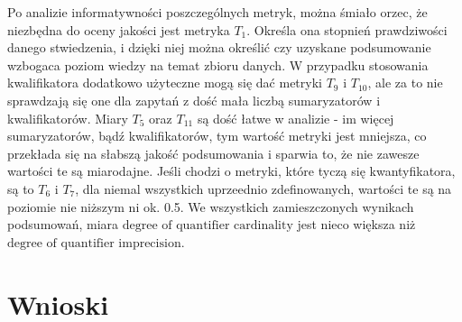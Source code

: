\documentclass{classrep}
\begin{document}
Po analizie informatywności poszczególnych metryk, można śmiało orzec, że niezbędna do oceny jakości jest metryka \(T_1\). Określa ona stopnień prawdziwości danego stwiedzenia, i dzięki niej można określić czy uzyskane podsumowanie wzbogaca poziom wiedzy na temat zbioru danych. 
W przypadku stosowania kwalifikatora dodatkowo użyteczne mogą się dać metryki \(T_9\) i $T_{10}$, ale za to nie sprawdzają się one dla zapytań z dość mała liczbą sumaryzatorów i kwalifikatorów. Miary $T_5$ oraz $T_{11}$ są dość łatwe w analizie - im więcej sumaryzatorów, bądź kwalifikatorów, tym wartość metryki jest mniejsza, co przekłada się na słabszą jakość podsumowania i sparwia to, że nie zawesze
wartości te są miarodajne. Jeśli chodzi o metryki, które tyczą się kwantyfikatora, są to $T_6$ i $T_7$, dla niemal wszystkich uprzeednio zdefinowanych, wartości te są na poziomie nie niższym ni ok. 0.5. We wszystkich zamieszczonych wynikach podsumowań, miara \(\text{degree of quantifier cardinality}\) jest nieco większa niż 
\(\text{degree of quantifier imprecision}\). 

\section{Wnioski}





% 
% 
% 
\end{document}
